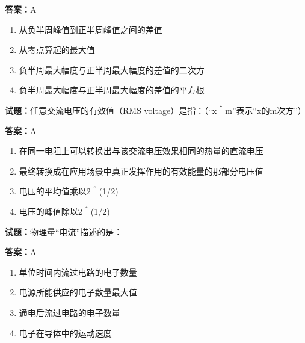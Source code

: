 \documentclass{ctexbook}
\begin{document}
\textbf{答案：}A 

\begin{enumerate}[leftmargin=3em]
  \item 从负半周峰值到正半周峰值之间的差值 

  \item 从零点算起的最大值 

  \item 负半周最大幅度与正半周最大幅度的差值的二次方 

  \item 负半周最大幅度与正半周最大幅度的差值的平方根 

\end{enumerate}





\vspace{1em}

\textbf{试题：}任意交流电压的有效值（RMS voltage）是指：（“x＾m”表示“x的m次方”） 

\textbf{答案：}A 

\begin{enumerate}[leftmargin=3em]
  \item 在同一电阻上可以转换出与该交流电压效果相同的热量的直流电压 

  \item 最终转换成在应用场景中真正发挥作用的有效能量的那部分电压值 

  \item 电压的平均值乘以2＾(1/2) 

  \item 电压的峰值除以2＾(1/2) 

\end{enumerate}





\vspace{1em}

\textbf{试题：}物理量“电流”描述的是： 

\textbf{答案：}A 

\begin{enumerate}[leftmargin=3em]
  \item 单位时间内流过电路的电子数量 

  \item 电源所能供应的电子数量最大值 

  \item 通电后流过电路的电子数量 

  \item 电子在导体中的运动速度 

\end{enumerate}
\end{document}
